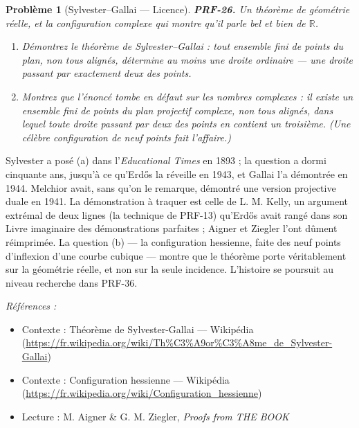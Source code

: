 \documentclass[11pt]{article}
\newtheorem{problem}{Problème}
\newenvironment{refs}{\par\small\noindent\emph{Références :}\begin{itemize}\setlength\itemsep{0pt}}{\end{itemize}\normalsize}
\begin{document}
\bigskip

\begin{problem}[{Sylvester--Gallai --- Licence}]
\textbf{PRF-26.} Un théorème de géométrie réelle, et la configuration complexe qui
montre qu'il parle bel et bien de $\mathbb{R}$.
\begin{enumerate}
\item[(a)] Démontrez le théorème de Sylvester--Gallai : tout ensemble
fini de points du plan, non tous alignés, détermine au moins une \textit{droite
ordinaire} --- une droite passant par exactement deux des points.
\item[(b)] Montrez que
l'énoncé tombe en défaut sur les nombres complexes : il existe un ensemble fini de points
du plan projectif complexe, non tous alignés, dans lequel toute droite passant par deux des
points en contient un troisième. (Une célèbre configuration de neuf points fait
l'affaire.)
\end{enumerate}

\end{problem}

\noindent Sylvester a posé (a) dans l'\textit{Educational Times} en 1893 ; la question
a dormi cinquante ans, jusqu'à ce qu'Erd\H{o}s la réveille en 1943, et Gallai l'a démontrée en
1944. Melchior avait, sans qu'on le remarque, démontré une version projective duale en 1941.
La démonstration à traquer est celle de L. M. Kelly, un argument extrémal de deux lignes (la
technique de PRF-13) qu'Erd\H{o}s avait rangé dans son \og{} Livre \fg{} imaginaire des démonstrations
parfaites ; Aigner et Ziegler l'ont dûment réimprimée. La question (b) --- la configuration
hessienne, faite des neuf points d'inflexion d'une courbe cubique --- montre que le théorème
porte véritablement sur la géométrie réelle, et non sur la seule incidence. L'histoire se
poursuit au niveau recherche dans PRF-36.

\begin{refs}
\item Contexte : Théorème de Sylvester-Gallai --- Wikipédia (\url{https://fr.wikipedia.org/wiki/Th%C3%A9or%C3%A8me_de_Sylvester-Gallai})
\item Contexte : Configuration hessienne --- Wikipédia (\url{https://fr.wikipedia.org/wiki/Configuration_hessienne})
\item Lecture : M. Aigner \& G. M. Ziegler, \textit{Proofs from THE BOOK}
\end{refs}

\bigskip
\end{document}
